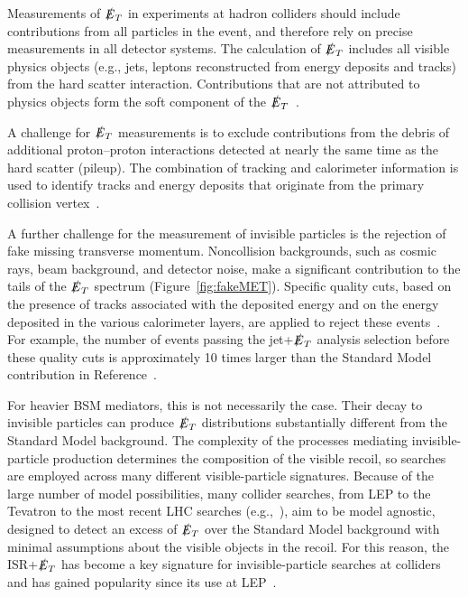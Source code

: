 \documentclass{ar-1col}
\newcommand{\IP}{invisible particle}
\newcommand{\MET}{\ensuremath{\slashed{E}_T}\xspace}
\begin{document}
{\begin{textbox}
\noindent Measurements of \MET in experiments at hadron colliders 
should include contributions from all particles in the event, 
and therefore rely on precise measurements in all detector systems. 
The calculation of \MET includes all visible physics objects 
(e.g., jets, leptons reconstructed from energy deposits and tracks)
from  the hard scatter interaction. 
Contributions that are not attributed to physics objects form the
soft component of the \MET~\cite{Aad:2016nrq,CMS-PAS-JME-16-004}.

A challenge for \MET measurements is to exclude contributions from
the debris of additional proton--proton interactions
detected at nearly the same time as the hard scatter (pileup). 
The combination of tracking and calorimeter information is used to identify
tracks and energy deposits that originate from the primary collision
vertex~\cite{CMS-PAS-JME-16-004,ATLAS-CONF-2014-019}. 

A further challenge for the measurement of invisible particles is
the rejection of fake missing transverse momentum. 
Noncollision backgrounds, such as cosmic rays, beam background, and detector
noise, make a significant contribution to the tails of the \MET
spectrum (Figure~\ref{fig:fakeMET}). Specific quality
cuts, based on the presence of tracks associated with the deposited
energy and on the energy deposited in the various calorimeter layers,
are applied to reject these events~\cite{ATLAS-CONF-2015-029}. For example, the
number of events passing the jet+\MET analysis selection before
these quality cuts is approximately 10 times larger than the Standard Model
contribution in Reference~.
\end{textbox}

For heavier BSM mediators, this is not necessarily the case. Their
decay to {\IP}s can produce \MET distributions substantially
different from the Standard Model background. The complexity of the processes
mediating invisible-particle production determines the composition
of the visible recoil, so searches are employed across many
different visible-particle signatures. 
Because of the large number of model possibilities, many collider
searches, from LEP to the Tevatron to the most recent LHC searches
(e.g.,~), aim to be model agnostic,
designed to detect an excess of \MET over the Standard Model background with
minimal assumptions about the visible objects in the recoil.
For this reason, the ISR+\MET has become a key
signature for invisible-particle searches at colliders
and has gained popularity since its use at LEP~\cite{Birkedal:2004xn}. 

}
\end{document}
